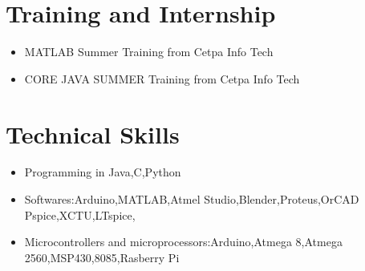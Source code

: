 \documentclass[8pt]{article}
\begin{document}
\section{Training and Internship}
\begin{itemize}
 \item MATLAB Summer Training from Cetpa Info Tech%
 \item CORE JAVA SUMMER Training from Cetpa Info Tech
 
\end{itemize}
\newpage
\section{Technical Skills}
\begin{itemize}
\item Programming in Java,C,Python
\item Softwares:Arduino,MATLAB,Atmel Studio,Blender,Proteus,OrCAD Pspice,XCTU,LTspice,
 \item Microcontrollers and microprocessors:Arduino,Atmega 8,Atmega 2560,MSP430,8085,Rasberry Pi
 \end{itemize}
\end{document}
